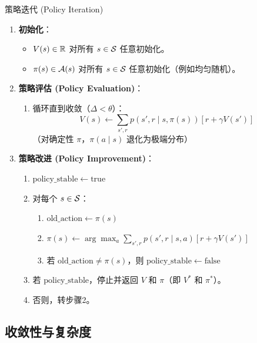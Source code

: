 \begin{myalgorithm}{策略迭代 (Policy Iteration)}
\begin{enumerate}
    \item \textbf{初始化}：
    \begin{itemize}
        \item $V(s) \in \mathbb{R}$ 对所有 $s \in \mathcal{S}$ 任意初始化。
        \item $\pi(s) \in \mathcal{A}(s)$ 对所有 $s \in \mathcal{S}$ 任意初始化（例如均匀随机）。
    \end{itemize}
    \item \textbf{策略评估 (Policy Evaluation)}：
    \begin{enumerate}
        \item 循环直到收敛（$\Delta < \theta$）：
        \[
        V(s) \leftarrow \sum_{s', r} p(s', r \mid s, \pi(s)) \left[ r + \gamma V(s') \right]
        \]
        （对确定性 $\pi$，$\pi(a \mid s)$ 退化为极端分布）
    \end{enumerate}
    \item \textbf{策略改进 (Policy Improvement)}：
    \begin{enumerate}
        \item $\mathrm{policy\_stable} \leftarrow \mathrm{true}$
        \item 对每个 $s \in \mathcal{S}$：
        \begin{enumerate}
            \item $\text{old\_action} \leftarrow \pi(s)$
            \item $\pi(s) \leftarrow \arg\max_{a} \sum_{s', r} p(s', r \mid s, a) \left[ r + \gamma V(s') \right]$
            \item 若 $\text{old\_action} \neq \pi(s)$，则 $\mathrm{policy\_stable} \leftarrow \mathrm{false}$
        \end{enumerate}
        \item 若 $\mathrm{policy\_stable}$，停止并返回 $V$ 和 $\pi$（即 $V^{*}$ 和 $\pi^{*}$）。
        \item 否则，转步骤2。
    \end{enumerate}
\end{enumerate}
\end{myalgorithm}

\subsection{收敛性与复杂度}

